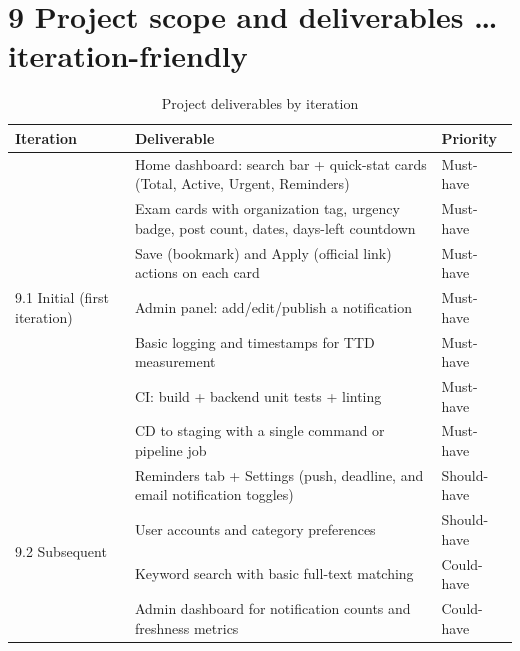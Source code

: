 \documentclass[11pt,a4paper]{article}
\begin{document}
\section*{9 Project scope and deliverables \dots iteration-friendly}
\begin{table}[h]
\centering
\begin{tabular}{|p{2.2cm}|p{9cm}|p{2.5cm}|}
\hline
\textbf{Iteration} & \textbf{Deliverable} & \textbf{Priority} \\
\hline
\multirow{7}{2.2cm}{9.1 Initial (first iteration)}
 & Home dashboard: search bar + quick-stat cards (Total, Active, Urgent,
 Reminders) & Must-have \\
\cline{2-3}
 & Exam cards with organization tag, urgency badge, post count, dates,
 days-left countdown & Must-have \\
\cline{2-3}
 & Save (bookmark) and Apply (official link) actions on each card &
 Must-have \\
\cline{2-3}
 & Admin panel: add/edit/publish a notification & Must-have \\
\cline{2-3}
 & Basic logging and timestamps for TTD measurement & Must-have \\
\cline{2-3}
 & CI: build + backend unit tests + linting & Must-have \\
\cline{2-3}
 & CD to staging with a single command or pipeline job & Must-have \\
\hline
\multirow{4}{2.2cm}{9.2 Subsequent} 
 & Reminders tab + Settings (push, deadline, and email notification
 toggles) & Should-have \\
\cline{2-3}
 & User accounts and category preferences & Should-have \\
\cline{2-3}
 & Keyword search with basic full-text matching & Could-have \\
\cline{2-3}
 & Admin dashboard for notification counts and freshness metrics & Could-have \\
\hline
\end{tabular}
\caption{Project deliverables by iteration}
\end{table}
\end{document}
